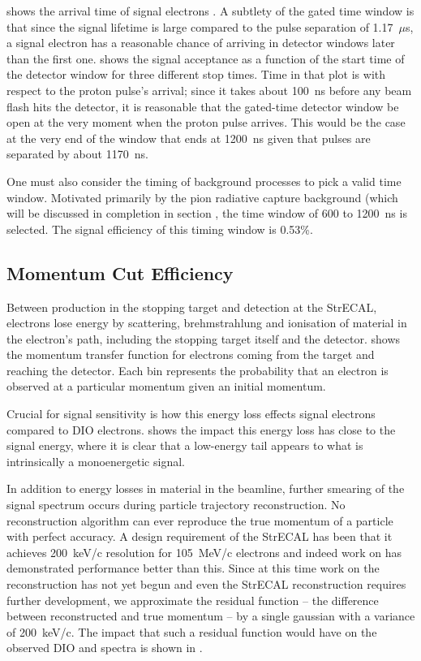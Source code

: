  shows the arrival time of signal electrons .
A subtlety of the gated time window is that since the signal lifetime is large compared to the pulse separation of 1.17~$\mu$s, a signal electron has a reasonable chance of arriving in detector windows later than the first one.
 shows the signal acceptance as a function of the start time of the detector window for three different stop times.
Time in that plot is with respect to the proton pulse's arrival; since it takes about 100~ns before any beam flash hits the detector, it is reasonable that the gated-time detector window be open at the very moment when the proton pulse arrives.
This would be the case at the very end of the window that ends at 1200~ns given that pulses are separated by about 1170~ns.

One must also consider the timing of background processes to pick a valid time window.
Motivated primarily by the pion radiative capture background (which will be discussed in completion in section , the time window of 600 to 1200~ns is selected.
The signal efficiency of this timing window is 0.53\%.

\FigSensMomTransfer
\subsection{Momentum Cut Efficiency}
\FigSensMomSpectra
Between production in the stopping target and detection at the StrECAL, electrons lose energy by scattering, brehmstrahlung and ionisation of material in the electron's path, including the stopping target itself and the detector.
 shows the momentum transfer function for electrons coming from the target and reaching the detector.
Each bin represents the probability that an electron is observed at a particular momentum given an initial momentum.

Crucial for signal sensitivity is how this energy loss effects signal electrons compared to \ac{DIO} electrons.
 shows the impact this energy loss has close to the signal energy, where it is clear that a low-energy tail appears to what is intrinsically a monoenergetic signal.

In addition to energy losses in material in the beamline, further smearing of the signal spectrum occurs during particle trajectory reconstruction.
No reconstruction algorithm can ever reproduce the true momentum of a particle with perfect accuracy.
A design requirement of the StrECAL has been that it achieves 200~keV/c resolution for 105~MeV/c electrons and indeed work on \phaseI has demonstrated performance better than this.
Since at this time work on the \phaseII reconstruction has not yet begun and even the \phaseI StrECAL reconstruction requires further development, we approximate the residual function -- the difference between reconstructed and true momentum -- by a single gaussian with a variance of 200~keV/c.
The impact that such a residual function would have on the observed DIO and \mueconv spectra is shown in .

